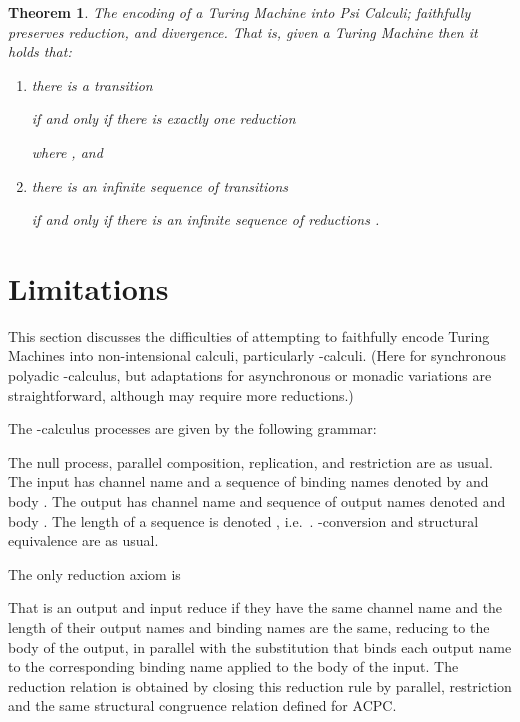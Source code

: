 \documentclass[submission,copyright,creativecommons]{eptcs}
\newtheorem{theorem}{Theorem}[section]
\begin{document}
\begin{theorem}
\label{thm:psi:done}
The encoding  of a Turing Machine into Psi Calculi;
faithfully preserves reduction, and
divergence.
That is, given a Turing Machine 
then it holds that:
\begin{enumerate}
\item there is a transition

if and only if there is exactly one reduction

where , and
\item there is an infinite sequence of transitions

if and only if there is an infinite sequence of reductions
.
\end{enumerate}
\end{theorem}

\section{Limitations}
\label{sec:fail}

\newcommand{\ifte}[4]{{\sf if}\ #1=#2\ {\sf then}\ #3\ {\sf else}\ #4}
\newcommand{\piiap}[2]{#1(#2)}
\newcommand{\pioap}[2]{\overline{#1}\langle #2\rangle}

This section discusses the difficulties of attempting to faithfully encode Turing Machines
into non-intensional calculi, particularly -calculi. (Here for synchronous polyadic -calculus, but
adaptations for asynchronous or monadic variations are straightforward, although may require
more reductions.)




The -calculus processes are given by the following grammar:

The null process, parallel composition, replication, and restriction are as usual.
The input  has channel name  and a sequence of binding names
 denoted by  and body .
The output  has channel name  and sequence of output names
 denoted  and body .
The length of a sequence  is denoted ,
i.e.~.
-conversion and structural equivalence are as usual.

The only reduction axiom is

That is an output and input reduce if they have the same channel name and the
length of their output names and binding names are the same, reducing to
the body of the output, in parallel with
the substitution that binds each output name  to the corresponding binding name 
applied to the body of the input.
The reduction relation is obtained by closing this reduction rule by parallel, restriction and the
same structural congruence relation defined for ACPC.
\end{document}
